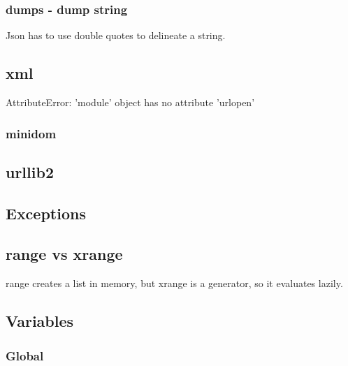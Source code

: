 \documentclass[12pt]{article}
\begin{document}
\subsubsection{dumps - dump string}

Json has to use double quotes to delineate a string.





\subsection{xml}AttributeError: 'module' object has no attribute 'urlopen'

\subsubsection{minidom}





\subsection{urllib2}





\subsection{Exceptions}






\subsection{range vs xrange}

range creates a list in memory, but xrange is a generator, so it evaluates lazily.



\subsection{Variables}

\subsubsection{Global}
\end{document}
